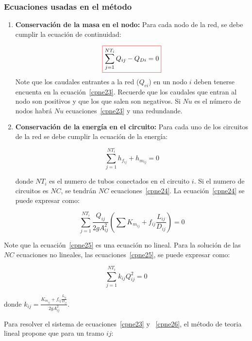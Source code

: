 \documentclass[11pt, oneside]{article}
\begin{document}
\subsubsection*{Ecuaciones usadas en el m\'etodo}
\begin{enumerate}
\item \textbf{Conservaci\'on de la masa en el nodo:} Para cada nodo de la red, se debe cumplir la ecuaci\'on de continuidad:

\begin{equation}
\color{red}\boxed{\color{black} \sum_{j=1}^{NT_i} Q_{ij} - Q_{Di}= 0}
\label{cpne23}
\end{equation}
Note que los caudales entrantes a la red ($Q_{ei}$) en un nodo $i$ deben tenerse encuenta en la ecuaci\'on~\ref{cpne23}. Recuerde que los caudales que entran al nodo son positivos y que los que salen son negativos. Si $Nu$ es el n\'umero de nodos habr\'a $Nu$ ecuaciones~\ref{cpne23} y una redundande.

\item \textbf{Conservaci\'on de la energ\'ia en el circuito:} Para cada uno de los circuitos de la red se debe cumplir la ecuaci\'on de la energ\'ia:

\begin{equation}
\sum_{j=1}^{NT_i} h_{f_{ij}} + h_{m_{ij}}= 0
\label{cpne24}
\end{equation}

donde $NT_i$ es el numero de tubos conectados en el circuito $i$. Si el numero de circuitos es $NC$, se tendr\'an $NC$ ecuaciones~\ref{cpne24}. La ecuaci\'on~\ref{cpne24} se puede expresar como:

\begin{equation}
\sum_{j=1}^{NT_i} \frac{Q_{ij}}{2gA_{ij}^2} \left(\sum K_{m_{ij}} + f_{ij}\frac{L_{ij}}{D_{ij}}  \right)= 0
\label{cpne25}
\end{equation}

\end{enumerate}
Note que la ecuaci\'on~\ref{cpne25} es una ecuaci\'on no lineal. Para la soluci\'on de las $NC$ ecuaciones no lineales, las ecuaciones~\ref{cpne25}, se puede expresar como:

\begin{equation}
\sum_{j=1}^{NT_i} k_{ij}Q_{ij}^2 = 0
\label{cpne26}
\end{equation}

donde $k_{ij} = \frac{K_{m_{ij}} + f_{ij}\frac{L_{ij}}{D_{ij}}}{2gA_{ij}^2}$.

Para resolver el sistema de ecuaciones~\ref{cpne23} y ~\ref{cpne26}, el m\'etodo de teoria lineal propone que para un tramo $ij$:
\end{document}
